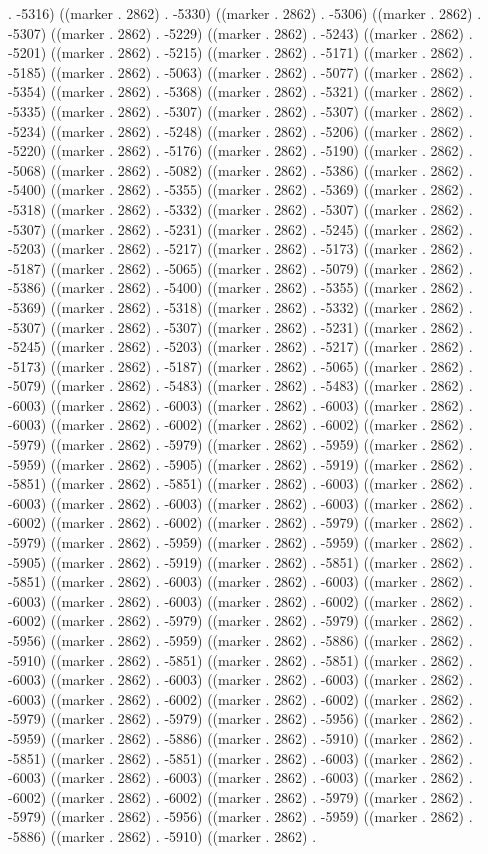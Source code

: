 . -5316) ((marker . 2862) . -5330) ((marker . 2862) . -5306) ((marker . 2862) . -5307) ((marker . 2862) . -5229) ((marker . 2862) . -5243) ((marker . 2862) . -5201) ((marker . 2862) . -5215) ((marker . 2862) . -5171) ((marker . 2862) . -5185) ((marker . 2862) . -5063) ((marker . 2862) . -5077) ((marker . 2862) . -5354) ((marker . 2862) . -5368) ((marker . 2862) . -5321) ((marker . 2862) . -5335) ((marker . 2862) . -5307) ((marker . 2862) . -5307) ((marker . 2862) . -5234) ((marker . 2862) . -5248) ((marker . 2862) . -5206) ((marker . 2862) . -5220) ((marker . 2862) . -5176) ((marker . 2862) . -5190) ((marker . 2862) . -5068) ((marker . 2862) . -5082) ((marker . 2862) . -5386) ((marker . 2862) . -5400) ((marker . 2862) . -5355) ((marker . 2862) . -5369) ((marker . 2862) . -5318) ((marker . 2862) . -5332) ((marker . 2862) . -5307) ((marker . 2862) . -5307) ((marker . 2862) . -5231) ((marker . 2862) . -5245) ((marker . 2862) . -5203) ((marker . 2862) . -5217) ((marker . 2862) . -5173) ((marker . 2862) . -5187) ((marker . 2862) . -5065) ((marker . 2862) . -5079) ((marker . 2862) . -5386) ((marker . 2862) . -5400) ((marker . 2862) . -5355) ((marker . 2862) . -5369) ((marker . 2862) . -5318) ((marker . 2862) . -5332) ((marker . 2862) . -5307) ((marker . 2862) . -5307) ((marker . 2862) . -5231) ((marker . 2862) . -5245) ((marker . 2862) . -5203) ((marker . 2862) . -5217) ((marker . 2862) . -5173) ((marker . 2862) . -5187) ((marker . 2862) . -5065) ((marker . 2862) . -5079) ((marker . 2862) . -5483) ((marker . 2862) . -5483) ((marker . 2862) . -6003) ((marker . 2862) . -6003) ((marker . 2862) . -6003) ((marker . 2862) . -6003) ((marker . 2862) . -6002) ((marker . 2862) . -6002) ((marker . 2862) . -5979) ((marker . 2862) . -5979) ((marker . 2862) . -5959) ((marker . 2862) . -5959) ((marker . 2862) . -5905) ((marker . 2862) . -5919) ((marker . 2862) . -5851) ((marker . 2862) . -5851) ((marker . 2862) . -6003) ((marker . 2862) . -6003) ((marker . 2862) . -6003) ((marker . 2862) . -6003) ((marker . 2862) . -6002) ((marker . 2862) . -6002) ((marker . 2862) . -5979) ((marker . 2862) . -5979) ((marker . 2862) . -5959) ((marker . 2862) . -5959) ((marker . 2862) . -5905) ((marker . 2862) . -5919) ((marker . 2862) . -5851) ((marker . 2862) . -5851) ((marker . 2862) . -6003) ((marker . 2862) . -6003) ((marker . 2862) . -6003) ((marker . 2862) . -6003) ((marker . 2862) . -6002) ((marker . 2862) . -6002) ((marker . 2862) . -5979) ((marker . 2862) . -5979) ((marker . 2862) . -5956) ((marker . 2862) . -5959) ((marker . 2862) . -5886) ((marker . 2862) . -5910) ((marker . 2862) . -5851) ((marker . 2862) . -5851) ((marker . 2862) . -6003) ((marker . 2862) . -6003) ((marker . 2862) . -6003) ((marker . 2862) . -6003) ((marker . 2862) . -6002) ((marker . 2862) . -6002) ((marker . 2862) . -5979) ((marker . 2862) . -5979) ((marker . 2862) . -5956) ((marker . 2862) . -5959) ((marker . 2862) . -5886) ((marker . 2862) . -5910) ((marker . 2862) . -5851) ((marker . 2862) . -5851) ((marker . 2862) . -6003) ((marker . 2862) . -6003) ((marker . 2862) . -6003) ((marker . 2862) . -6003) ((marker . 2862) . -6002) ((marker . 2862) . -6002) ((marker . 2862) . -5979) ((marker . 2862) . -5979) ((marker . 2862) . -5956) ((marker . 2862) . -5959) ((marker . 2862) . -5886) ((marker . 2862) . -5910) ((marker . 2862) . 